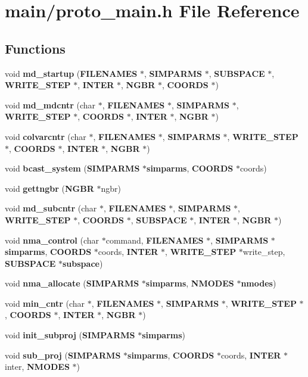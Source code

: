 \section{main/proto\_\-main.h File Reference}
\label{proto__main_8h}
\subsection*{Functions}
\begin{CompactItemize}
\item 
void {\bf md\_\-startup} ({\bf FILENAMES} $\ast$, {\bf SIMPARMS} $\ast$, {\bf SUBSPACE} $\ast$, {\bf WRITE\_\-STEP} $\ast$, {\bf INTER} $\ast$, {\bf NGBR} $\ast$, {\bf COORDS} $\ast$)
\item 
void {\bf md\_\-mdcntr} (char $\ast$, {\bf FILENAMES} $\ast$, {\bf SIMPARMS} $\ast$, {\bf WRITE\_\-STEP} $\ast$, {\bf COORDS} $\ast$, {\bf INTER} $\ast$, {\bf NGBR} $\ast$)
\item 
void {\bf colvarcntr} (char $\ast$, {\bf FILENAMES} $\ast$, {\bf SIMPARMS} $\ast$, {\bf WRITE\_\-STEP} $\ast$, {\bf COORDS} $\ast$, {\bf INTER} $\ast$, {\bf NGBR} $\ast$)
\item 
void {\bf bcast\_\-system} ({\bf SIMPARMS} $\ast${\bf simparms}, {\bf COORDS} $\ast$coords)
\item 
void {\bf gettngbr} ({\bf NGBR} $\ast$ngbr)
\item 
void {\bf md\_\-subcntr} (char $\ast$, {\bf FILENAMES} $\ast$, {\bf SIMPARMS} $\ast$, {\bf WRITE\_\-STEP} $\ast$, {\bf COORDS} $\ast$, {\bf SUBSPACE} $\ast$, {\bf INTER} $\ast$, {\bf NGBR} $\ast$)
\item 
void {\bf nma\_\-control} (char $\ast$command, {\bf FILENAMES} $\ast$, {\bf SIMPARMS} $\ast${\bf simparms}, {\bf COORDS} $\ast$coords, {\bf INTER} $\ast$, {\bf WRITE\_\-STEP} $\ast$write\_\-step, {\bf SUBSPACE} $\ast${\bf subspace})
\item 
void {\bf nma\_\-allocate} ({\bf SIMPARMS} $\ast${\bf simparms}, {\bf NMODES} $\ast${\bf nmodes})
\item 
void {\bf min\_\-cntr} (char $\ast$, {\bf FILENAMES} $\ast$, {\bf SIMPARMS} $\ast$, {\bf WRITE\_\-STEP} $\ast$, {\bf COORDS} $\ast$, {\bf INTER} $\ast$, {\bf NGBR} $\ast$)
\item 
void {\bf init\_\-subproj} ({\bf SIMPARMS} $\ast${\bf simparms})
\item 
void {\bf sub\_\-proj} ({\bf SIMPARMS} $\ast${\bf simparms}, {\bf COORDS} $\ast$coords, {\bf INTER} $\ast$inter, {\bf NMODES} $\ast$)
\end{CompactItemize}


